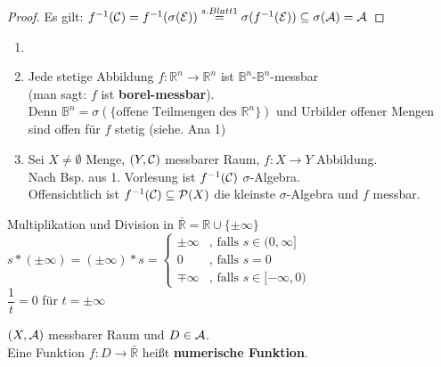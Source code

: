  \begin{proof}
    Es gilt: $f^{-1}(\mathcal{C}) = f^{-1}(\sigma(\mathcal{E})) \stackrel{s. Blatt 1}{=} \sigma(f^{-1}(\mathcal{E})) \subseteq \sigma(\mathcal{A}) = \mathcal{A}$
  \end{proof}

  \begin{example}
    \begin{enumerate}
      \item[]
      \item Jede stetige Abbildung $f: \mathbb{R}^n \to \mathbb{R}^n$ ist $\mathbb{B}^n$-$\mathbb{B}^n$-messbar\\
            (man sagt: $f$ ist \textbf{borel-messbar}).\\
            Denn $\mathbb{B}^n = \sigma(\{\text{offene Teilmengen des } \mathbb{R}^n\})$ und Urbilder offener Mengen sind offen für $f$ stetig (siehe. Ana 1)
      \item Sei $X \neq \emptyset$ Menge, $(Y, \mathcal{C})$ messbarer Raum, $f: X \to Y$ Abbildung.\\
            Nach Bsp. aus 1. Vorlesung ist $f^{-1}(\mathcal{C})$ $\sigma$-Algebra.\\
            Offensichtlich ist $f^{-1}(\mathcal{C}) \subseteq \mathcal{P}(X)$ die kleinste $\sigma$-Algebra und $f$ messbar.
    \end{enumerate}
  \end{example}

  \begin{notation}
    Multiplikation und Division in $\bar{\mathbb{R}} = \mathbb{R} \cup \{\pm \infty\}$\\
    $s * (\pm \infty) = (\pm \infty) * s = \begin{cases}\pm \infty & \text{, falls } s \in (0, \infty] \\ 0 & \text{, falls } s = 0 \\ \mp \infty & \text{, falls } s \in [-\infty, 0)\end{cases}$\\
    $\dfrac{1}{t} = 0$ für $t = \pm \infty$
  \end{notation}

  \begin{definition}
    $(X, \mathcal{A})$ messbarer Raum und $D \in \mathcal{A}$.\\
    Eine Funktion $f: D \to \bar{\mathbb{R}}$ heißt \textbf{numerische Funktion}.
  \end{definition}

